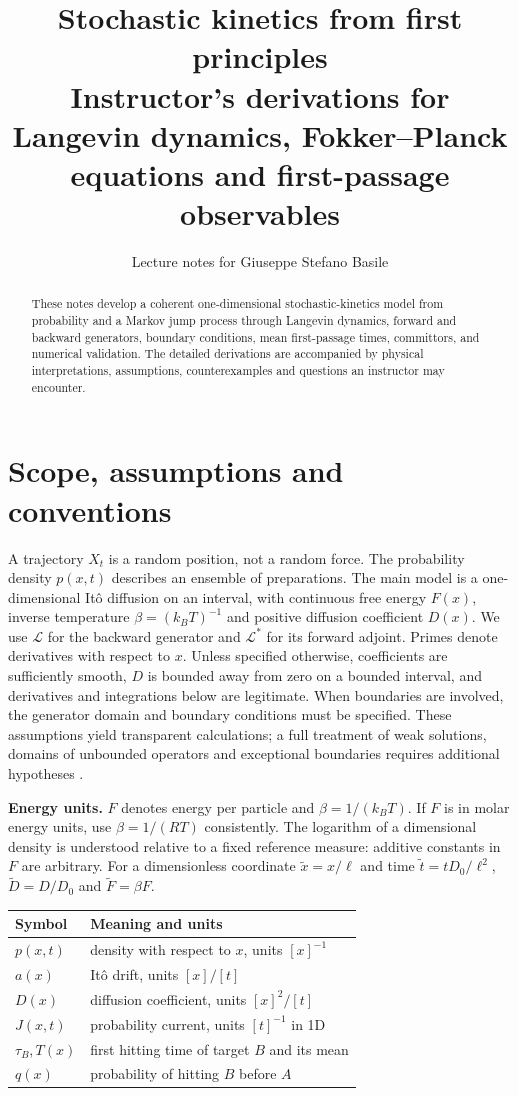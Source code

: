 \documentclass[11pt,a4paper]{article}
\title{\textbf{Stochastic kinetics from first principles}\\[4pt]\large Instructor's derivations for Langevin dynamics, Fokker--Planck equations and first-passage observables}
\author{Lecture notes for Giuseppe Stefano Basile}
\date{}
\newcommand{\Lop}{\mathcal L}
\theoremstyle{remark}\newtheorem*{remark}{Physical interpretation}
\begin{document}
\maketitle
\begin{abstract}
These notes develop a coherent one-dimensional stochastic-kinetics model from probability and a Markov jump process through Langevin dynamics, forward and backward generators, boundary conditions, mean first-passage times, committors, and numerical validation. The detailed derivations are accompanied by physical interpretations, assumptions, counterexamples and questions an instructor may encounter. 
\end{abstract}
\tableofcontents
\newpage
\section{Scope, assumptions and conventions}
A trajectory $X_t$ is a random position, not a random force. The probability density $p(x,t)$ describes an ensemble of preparations. The main model is a one-dimensional It\^o diffusion on an interval, with continuous free energy $F(x)$, inverse temperature $\beta=(k_BT)^{-1}$ and positive diffusion coefficient $D(x)$. We use $\Lop$ for the backward generator and $\Lop^*$ for its forward adjoint. Primes denote derivatives with respect to $x$. Unless specified otherwise, coefficients are sufficiently smooth, $D$ is bounded away from zero on a bounded interval, and derivatives and integrations below are legitimate. When boundaries are involved, the generator domain and boundary conditions must be specified. These assumptions yield transparent calculations; a full treatment of weak solutions, domains of unbounded operators and exceptional boundaries requires additional hypotheses \cite{vankampen,gardiner,risken}.

\textbf{Energy units.} $F$ denotes energy per particle and $\beta=1/(k_BT)$. If $F$ is in molar energy units, use $\beta=1/(RT)$ consistently. The logarithm of a dimensional density is understood relative to a fixed reference measure: additive constants in $F$ are arbitrary. For a dimensionless coordinate $\tilde x=x/\ell$ and time $\tilde t=tD_0/\ell^2$, $\tilde D=D/D_0$ and $\tilde F=\beta F$.

\begin{center}
\begin{tabular}{ll}
\toprule Symbol & Meaning and units \\
\midrule $p(x,t)$ & density with respect to $x$, units $[x]^{-1}$ \\
$a(x)$ & It\^o drift, units $[x]/[t]$ \\
$D(x)$ & diffusion coefficient, units $[x]^2/[t]$ \\
$J(x,t)$ & probability current, units $[t]^{-1}$ in 1D \\
$\tau_B,T(x)$ & first hitting time of target $B$ and its mean \\
$q(x)$ & probability of hitting $B$ before $A$ \\
\bottomrule
\end{tabular}
\end{center}
\end{document}
